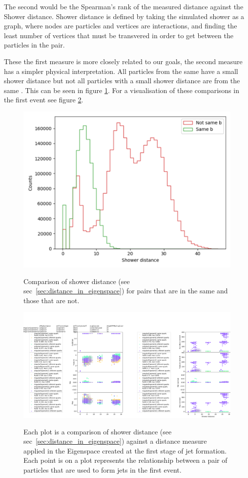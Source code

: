 The second would be the Spearman's rank of the measured distance against the Shower distance.
Shower distance is defined by taking the simulated shower as a graph, where nodes are particles
and vertices are interactions, and finding the least number of vertices that must be transvered 
in order to get between the particles in the pair.

These the first measure is more closely related to our goals,
the second measure has a simpler physical interpretation.
All particles from the same  have a small shower distance
but not all particles with a small shower distance are from the same .
This can be seen in figure \ref{fig:shower_distance_example}.
For a visualisation of these comparisons in the first event see figure \ref{fig:eigenspace_distance_example}.

\begin{figure}[htp]
    \includegraphics[width=.5\textwidth]{graphics/shower_distance_example}
    \label{fig:shower_distance_example}
    \caption{
        Comparison of shower distance (see sec~\ref{sec:distance_in_eigenspace})
        for pairs that are in the same 
        and those that are not.
             }
\end{figure}    

\begin{figure}[htp]
    \includegraphics[width=1.\textwidth]{graphics/eigenspace_distance_example}
    \label{fig:eigenspace_distance_example}
    \caption{
        Each plot is a comparison of shower distance (see sec~\ref{sec:distance_in_eigenspace})
        against a distance measure applied in the Eigenspace created at the first stage of
        jet formation.
        Each point is on a plot represents the relationship between a pair of particles
        that are used to form jets in the first event.
             }
\end{figure}    

